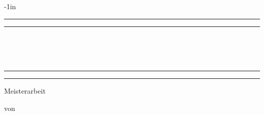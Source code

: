
\begin{titlepage} %

\begin{adjustwidth*}{}{-1in}

	\centering %
	
	\scshape %
	
	\vspace*{\baselineskip} %
	
	
	\rule{\textwidth}{1.6pt}\vspace*{-\baselineskip}\vspace*{2pt} %
	\rule{\textwidth}{0.4pt} %
	
	\vspace{0.75\baselineskip} %
	
	{\LARGE \textsc{\titleen}\\\\\vspace{0.3cm}\titlede\\} %
	
	\vspace{0.75\baselineskip} %
	
	\rule{\textwidth}{0.4pt}\vspace*{-\baselineskip}\vspace{3.2pt} %
	\rule{\textwidth}{1.6pt} %
	
	\vspace{2\baselineskip} %
	
	Meisterarbeit

	\vspace*{3\baselineskip} %
	
	
	von

	\vspace{0.5\baselineskip} %
	

\end{adjustwidth*}
\end{titlepage}
